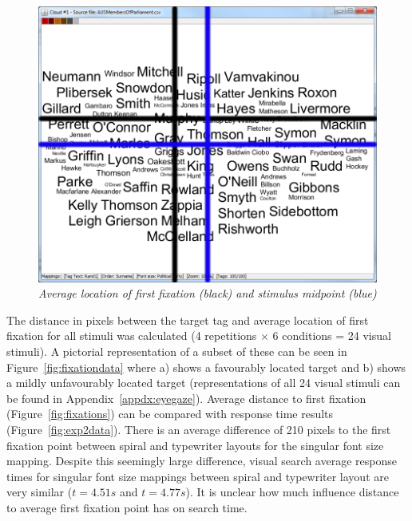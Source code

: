 \begin{figure}[!htb]
	\centering
	\includegraphics[scale=0.40]{averagefixation.png}
	\caption{\textit{Average location of first fixation (black) and stimulus midpoint (blue)}}
	\label{fig:exp2firstfix}
\end{figure}


The distance in pixels between the target tag and average location of first fixation for all stimuli was calculated (4 repetitions $\times$ 6 conditions = 24 visual stimuli). A pictorial representation of a subset of these can be seen in Figure~\vref{fig:fixationdata} where a) shows a favourably located target and b) shows a mildly unfavourably located target (representations of all 24 visual stimuli can be found in Appendix~\ref{appdx:eyegaze}). Average distance to first fixation (Figure~\vref{fig:fixations}) can be compared with response time results (Figure~\vref{fig:exp2data}). There is an average difference of 210 pixels to the first fixation point between spiral and typewriter layouts for the singular font size mapping. Despite this seemingly large difference, visual search average response times for singular font size mappings between spiral and typewriter layout are very similar ($t=4.51s$ and $t=4.77s$). It is unclear how much influence distance to average first fixation point has on search time.  

